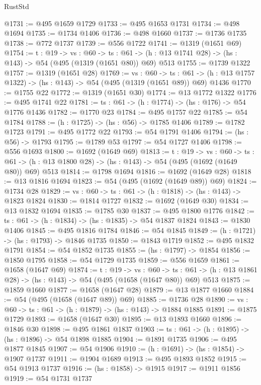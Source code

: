 \begin{lexlean}{RustStd}
\begin{coremodule}
{\begin{coremodule}
{{{{{@1731 := @495 @1659 @1729
@1733 := @495 @1653 @1731
@1734 := @498 @1694
@1735 := @1734 @1406
@1736 := @498 @1660
@1737 := @1736 @1735
@1738 := @772 @1737
@1739 := @556 @1722
@1741 := @1319 (@1651 @69)
@1754 := {t : @19} ->
  {vs : @60} ->
  {ts : @61} -> (h : @13 @1741 @28) -> (hs : @143) -> @54 (@495 (@1319 (@1651 @80)) @69) @513
@1755 := @1739 @1322
@1757 := @1319 (@1651 @28)
@1769 := {vs : @60} ->
  {ts : @61} -> (h : @13 @1757 @1322) -> (hs : @143) -> @54 (@495 (@1319 (@1651 @89)) @69) @1436
@1770 := @1755 @22
@1772 := @1319 (@1651 @30)
@1774 := @13 @1772 @1322
@1776 := @495 @1741 @22
@1781 := {ts : @61} -> (h : @1774) -> (hs : @176) -> @54 @1776 @1436
@1782 := @1770 @23
@1784 := @495 @1757 @22
@1785 := @54 @1784
@1788 := (h : @1725) -> (hs : @56) -> @1785 @1406
@1789 := @1782 @1723
@1791 := @495 @1772 @22
@1793 := @54 @1791 @1406
@1794 := (hs : @56) -> @1793
@1795 := @1789 @53
@1797 := @54 @1727 @1406
@1798 := @556 @1693
@1800 := @1692 (@1649 @69)
@1813 := {t : @19} ->
  {vs : @60} ->
  {ts : @61} -> (h : @13 @1800 @28) -> (hs : @143) -> @54 (@495 (@1692 (@1649 @80)) @69) @513
@1814 := @1798 @1694
@1816 := @1692 (@1649 @28)
@1818 := @13 @1816 @1694
@1823 := @54 (@495 (@1692 (@1649 @89)) @69)
@1824 := @1734 @28
@1829 := {vs : @60} -> {ts : @61} -> (h : @1818) -> (hs : @143) -> @1823 @1824
@1830 := @1814 @1727
@1832 := @1692 (@1649 @30)
@1834 := @13 @1832 @1694
@1835 := @1785 @30
@1837 := @495 @1800 @1776
@1842 := {ts : @61} -> (h : @1834) -> (hs : @1835) -> @54 @1837 @1824
@1843 := @1830 @1406
@1845 := @495 @1816 @1784
@1846 := @54 @1845
@1849 := (h : @1721) -> (hs : @1793) -> @1846 @1735
@1850 := @1843 @1719
@1852 := @495 @1832 @1791
@1854 := @54 @1852 @1735
@1855 := (hs : @1797) -> @1854
@1856 := @1850 @1795
@1858 := @54 @1729 @1735
@1859 := @556 @1659
@1861 := @1658 (@1647 @69)
@1874 := {t : @19} ->
  {vs : @60} ->
  {ts : @61} -> (h : @13 @1861 @28) -> (hs : @143) -> @54 (@495 (@1658 (@1647 @80)) @69) @513
@1875 := @1859 @1660
@1877 := @1658 (@1647 @28)
@1879 := @13 @1877 @1660
@1884 := @54 (@495 (@1658 (@1647 @89)) @69)
@1885 := @1736 @28
@1890 := {vs : @60} -> {ts : @61} -> (h : @1879) -> (hs : @143) -> @1884 @1885
@1891 := @1875 @1729
@1893 := @1658 (@1647 @30)
@1895 := @13 @1893 @1660
@1896 := @1846 @30
@1898 := @495 @1861 @1837
@1903 := {ts : @61} -> (h : @1895) -> (hs : @1896) -> @54 @1898 @1885
@1904 := @1891 @1735
@1906 := @495 @1877 @1845
@1907 := @54 @1906
@1910 := (h : @1691) -> (hs : @1854) -> @1907 @1737
@1911 := @1904 @1689
@1913 := @495 @1893 @1852
@1915 := @54 @1913 @1737
@1916 := (hs : @1858) -> @1915
@1917 := @1911 @1856
@1919 := @54 @1731 @1737
}}}}}
\end{coremodule}}
\end{coremodule}
\end{lexlean}
